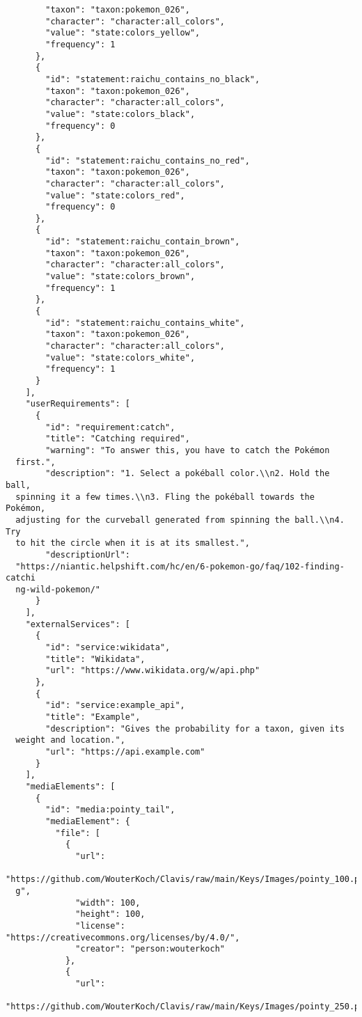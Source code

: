 \documentclass[10pt,letterpaper]{article}
\begin{document}
\begin{verbatim}
        "taxon": "taxon:pokemon_026",
        "character": "character:all_colors",
        "value": "state:colors_yellow",
        "frequency": 1
      },
      {
        "id": "statement:raichu_contains_no_black",
        "taxon": "taxon:pokemon_026",
        "character": "character:all_colors",
        "value": "state:colors_black",
        "frequency": 0
      },
      {
        "id": "statement:raichu_contains_no_red",
        "taxon": "taxon:pokemon_026",
        "character": "character:all_colors",
        "value": "state:colors_red",
        "frequency": 0
      },
      {
        "id": "statement:raichu_contain_brown",
        "taxon": "taxon:pokemon_026",
        "character": "character:all_colors",
        "value": "state:colors_brown",
        "frequency": 1
      },
      {
        "id": "statement:raichu_contains_white",
        "taxon": "taxon:pokemon_026",
        "character": "character:all_colors",
        "value": "state:colors_white",
        "frequency": 1
      }
    ],
    "userRequirements": [
      {
        "id": "requirement:catch",
        "title": "Catching required",
        "warning": "To answer this, you have to catch the Pokémon
  first.",
        "description": "1. Select a pokéball color.\\n2. Hold the ball,
  spinning it a few times.\\n3. Fling the pokéball towards the Pokémon,
  adjusting for the curveball generated from spinning the ball.\\n4. Try
  to hit the circle when it is at its smallest.",
        "descriptionUrl":
  "https://niantic.helpshift.com/hc/en/6-pokemon-go/faq/102-finding-catchi
  ng-wild-pokemon/"
      }
    ],
    "externalServices": [
      {
        "id": "service:wikidata",
        "title": "Wikidata",
        "url": "https://www.wikidata.org/w/api.php"
      },
      {
        "id": "service:example_api",
        "title": "Example",
        "description": "Gives the probability for a taxon, given its
  weight and location.",
        "url": "https://api.example.com"
      }
    ],
    "mediaElements": [
      {
        "id": "media:pointy_tail",
        "mediaElement": {
          "file": [
            {
              "url":
  "https://github.com/WouterKoch/Clavis/raw/main/Keys/Images/pointy_100.pn
  g",
              "width": 100,
              "height": 100,
              "license": "https://creativecommons.org/licenses/by/4.0/",
              "creator": "person:wouterkoch"
            },
            {
              "url":
  "https://github.com/WouterKoch/Clavis/raw/main/Keys/Images/pointy_250.pn

\end{verbatim}
\end{document}
